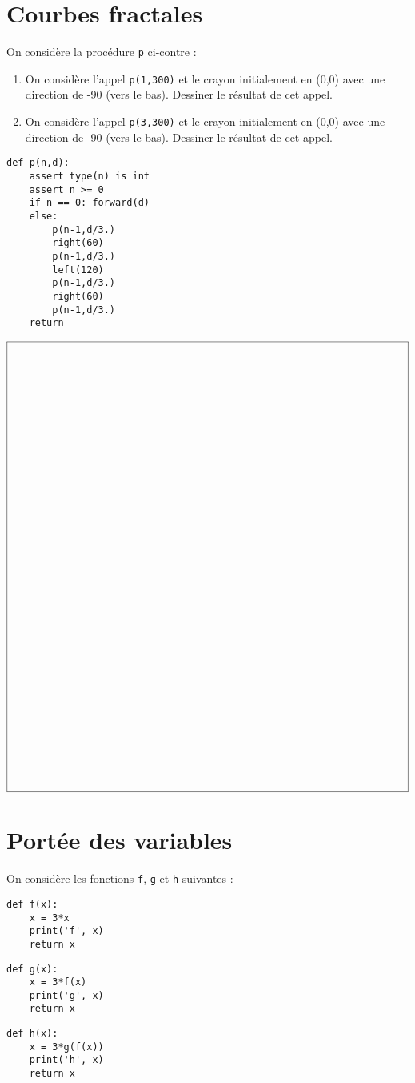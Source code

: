 \documentclass[11pt,a4paper]{article}
\begin{document}
\section{Courbes fractales}
\begin{minipage}[t]{7cm}
On consid\`ere la proc\'edure {\tt p} ci-contre :
\begin{enumerate}
\item On consid\`ere l'appel {\tt p(1,300)} et le crayon initialement en (0,0)
	avec une direction de -90 (vers le bas).
	Dessiner le r\'esultat de cet appel.
\item On consid\`ere l'appel {\tt p(3,300)} et le crayon initialement en (0,0)
	avec une direction de -90 (vers le bas).
	Dessiner le r\'esultat de cet appel.
\end{enumerate}
\end{minipage}
\hfill
\begin{py}{7cm}
\begin{verbatim}
def p(n,d):
    assert type(n) is int
    assert n >= 0
    if n == 0: forward(d)
    else:
        p(n-1,d/3.)
        right(60)
        p(n-1,d/3.)
        left(120)
        p(n-1,d/3.)
        right(60)
        p(n-1,d/3.)
    return
\end{verbatim}
\end{py}


$$\framebox[14.5cm]{$\rule{0cm}{16cm}$}$$

\section{Portée des variables}
On considère les fonctions {\tt f}, {\tt g} et {\tt h} suivantes :
\begin{center}
\begin{py}{4cm}
\begin{verbatim}
def f(x):
    x = 3*x
    print('f', x)
    return x
\end{verbatim}
\end{py}\hspace*{1cm}
\begin{py}{4cm}
\begin{verbatim}
def g(x):
    x = 3*f(x)
    print('g', x)
    return x
\end{verbatim}
\end{py}\hspace*{1cm}
\begin{py}{4cm}
\begin{verbatim}
def h(x):
    x = 3*g(f(x))
    print('h', x)
    return x
\end{verbatim}
\end{py}
\end{center}
\end{document}
